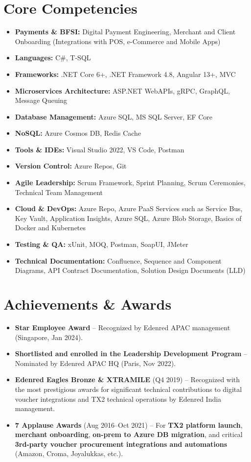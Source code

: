\documentclass[12pt,a4paper]{article}
\begin{document}
\section*{Core Competencies}
\begin{itemize}
    \item \textbf{Payments \& BFSI:} Digital Payment Engineering, Merchant and Client Onboarding (Integrations with POS, e-Commerce and Mobile Apps)
    \item \textbf{Languages:} C\#, T-SQL
    \item \textbf{Frameworks:} .NET Core 6+, .NET Framework 4.8, Angular 13+, MVC
    \item \textbf{Microservices Architecture:} ASP.NET WebAPIs, gRPC,  GraphQL, Message Queuing
    \item \textbf{Database Management:} Azure SQL, MS SQL Server, EF Core
    \item \textbf{NoSQL:} Azure Cosmos DB, Redis Cache
    
    \item \textbf{Tools \& IDEs:} Visual Studio 2022, VS Code, Postman
    \item \textbf{Version Control:} Azure Repos, Git
    \item \textbf{Agile Leadership:} Scrum Framework, Sprint Planning, Scrum Ceremonies, Technical Team Management
    \item \textbf{Cloud \& DevOps:} Azure Repo, Azure PaaS Services such as Service Bus, Key Vault, Application Insights, Azure SQL, Azure Blob Storage, Basics of Docker and Kubernetes
    \item \textbf{Testing \& QA:} xUnit, MOQ, Postman, SoapUI, JMeter
    \item \textbf{Technical Documentation:} Confluence, Sequence and Component Diagrams, API Contract Documentation, Solution Design Documents (LLD)
\end{itemize}

\section*{Achievements \& Awards}
\begin{itemize}
    \item \textbf{Star Employee Award} -- Recognized by Edenred APAC management (Singapore, Jan 2024).
    \item \textbf{Shortlisted and enrolled in the Leadership Development Program} -- Nominated by Edenred APAC HQ (Paris, Nov 2022).
    \item \textbf{Edenred Eagles Bronze \& XTRAMILE} (Q4 2019) -- Recognized with the most prestigious awards for significant technical contributions to digital voucher integrations and TX2 technical operations by Edenred India management.
    \item \textbf{7 Applause Awards} (Aug 2016--Oct 2021) -- For \textbf{TX2 platform launch}, \textbf{merchant onboarding}, \textbf{on-prem to Azure DB migration}, and critical \textbf{3rd-party voucher procurement integrations and automations} (Amazon, Croma, Joyalukkas, etc.).
\end{itemize}
\end{document}

